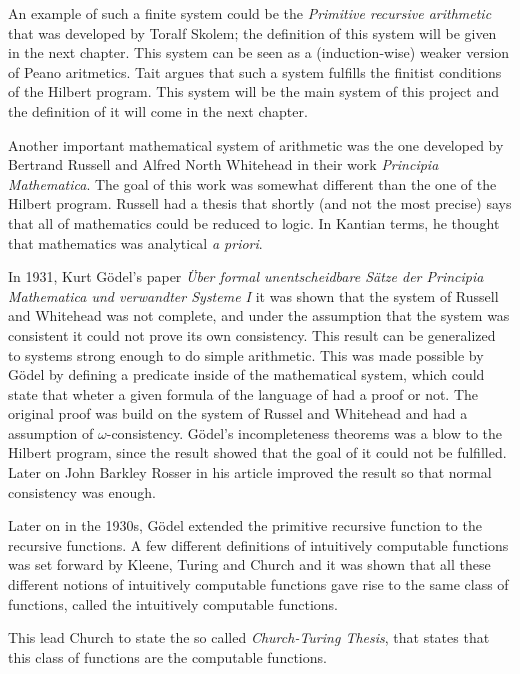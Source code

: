 \documentclass[../main.tex]{subfiles}
\begin{document}
An example of such a finite system could be the \textit{Primitive recursive
arithmetic} that was developed by Toralf Skolem; the definition of this system
will be given in the next chapter. This system can be seen as a
(induction-wise) weaker version of Peano aritmetics. Tait  argues
that such a system fulfills the finitist conditions of the Hilbert program.
This system will be the main system of this project and the definition of it
will come in the next chapter.

Another  important mathematical system of arithmetic was
the one developed by Bertrand Russell and Alfred North Whitehead in their work
\textit{Principia Mathematica}. The goal of this work was somewhat different
than the one of the Hilbert program. Russell had a thesis that shortly (and not
the most precise) says that all of mathematics could be reduced to logic. In
Kantian terms, he thought that mathematics was analytical \textit{a priori}. 

In 1931, Kurt Gödel's paper \textit{Über formal unentscheidbare Sätze der
Principia Mathematica und verwandter Systeme I} it was shown  that the system of
Russell and Whitehead was not complete, and under the assumption that the
system was consistent it could not prove its own consistency.
This result can be generalized to systems strong enough to do simple
arithmetic. This was made possible by Gödel by defining a predicate inside of
the mathematical system, which could state that wheter a given formula of the
language of had a proof or not.
The
original proof was build on the system of Russel and Whitehead and had a
assumption of $\omega$-consistency. Gödel's incompleteness theorems
was a blow to the Hilbert program, since the result showed that the goal of it
could not be fulfilled. Later on John Barkley Rosser in his article
\citet{Ross1936} improved the
result so that normal  consistency was enough.



Later on in the 1930s, Gödel extended the primitive recursive function to the  recursive
functions. A few different definitions of intuitively computable functions was
set forward by Kleene, Turing and Church and it was shown that all these
different notions of intuitively computable functions gave rise to the same
class of functions, called the intuitively computable functions.

This lead Church to state the so called \textit{Church-Turing Thesis}, that
states that this class of functions are the computable functions.
\end{document}
